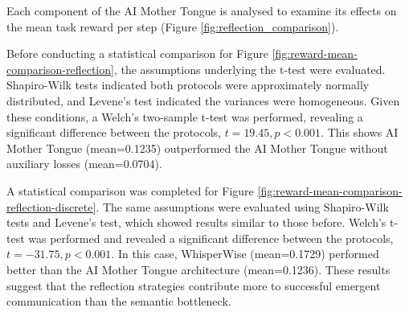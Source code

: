 Each component of the AI Mother Tongue is analysed to examine its effects on the mean task reward per step (Figure \ref{fig:reflection_comparison}).

Before conducting a statistical comparison for Figure \ref{fig:reward-mean-comparison-reflection}, the assumptions underlying the t-test were evaluated.
Shapiro-Wilk tests indicated both protocols were approximately normally distributed, and Levene's test indicated the variances were homogeneous.
Given these conditions, a Welch's two-sample t-test was performed, revealing a significant difference between the protocols, $t=19.45,p<0.001$.
This shows AI Mother Tongue (mean=0.1235) outperformed the AI Mother Tongue without auxiliary losses (mean=0.0704).

A statistical comparison was completed for Figure \ref{fig:reward-mean-comparison-reflection-discrete}.
The same assumptions were evaluated using Shapiro-Wilk tests and Levene's test, which showed results similar to those before.
Welch's t-test was performed and revealed a significant difference between the protocols, $t=-31.75,p<0.001$.
In this case, WhisperWise (mean=0.1729) performed better than the AI Mother Tongue architecture (mean=0.1236).
These results suggest that the reflection strategies contribute more to successful emergent communication than the semantic bottleneck.





